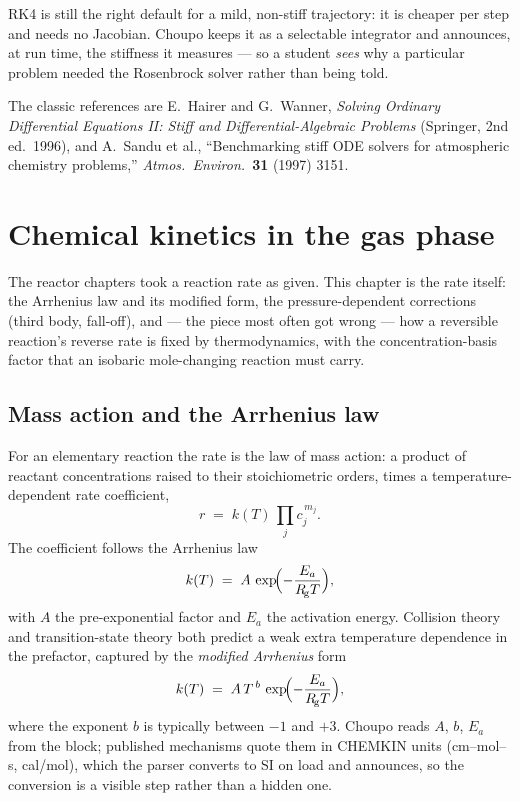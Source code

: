 \documentclass[11pt,a4paper]{article}
\newcommand{\Rgas}{R_{\!\mathrm{g}}}                %
\begin{document}
\begin{intuition}
RK4 is still the right default for a mild, non-stiff trajectory: it is
cheaper per step and needs no Jacobian.  Choupo keeps it as a
selectable integrator and announces, at run time, the stiffness it
measures --- so a student \emph{sees} why a particular problem needed
the Rosenbrock solver rather than being told.
\end{intuition}

The classic references are E.~Hairer and G.~Wanner, \emph{Solving
Ordinary Differential Equations II: Stiff and Differential-Algebraic
Problems} (Springer, 2nd ed.\ 1996), and A.~Sandu et al., ``Benchmarking
stiff ODE solvers for atmospheric chemistry problems,'' \emph{Atmos.\
Environ.}\ \textbf{31} (1997) 3151.

\section{Chemical kinetics in the gas phase}\label{ch:gas-kinetics}

\begin{whatyoulllearn}
The reactor chapters took a reaction rate as given.  This chapter is
the rate itself: the Arrhenius law and its modified form, the
pressure-dependent corrections (third body, fall-off), and --- the
piece most often got wrong --- how a reversible reaction's reverse
rate is fixed by thermodynamics, with the concentration-basis factor
that an isobaric mole-changing reaction must carry.
\end{whatyoulllearn}

\subsection{Mass action and the Arrhenius law}

For an elementary reaction the rate is the law of mass action: a
product of reactant concentrations raised to their stoichiometric
orders, times a temperature-dependent rate coefficient,
\begin{equation}
    r \;=\; k(T)\,\prod_j c_j^{\,m_j}.
    \label{eq:mass-action}
\end{equation}
The coefficient follows the Arrhenius law
\begin{equation}
    k(T) \;=\; A\,\exp\!\Bigl(-\frac{E_a}{\Rgas T}\Bigr),
    \label{eq:arrhenius}
\end{equation}
with $A$ the pre-exponential factor and $E_a$ the activation energy.
Collision theory and transition-state theory both predict a weak extra
temperature dependence in the prefactor, captured by the
\emph{modified Arrhenius} form
\begin{equation}
    k(T) \;=\; A\,T^{\,b}\,\exp\!\Bigl(-\frac{E_a}{\Rgas T}\Bigr),
    \label{eq:mod-arrhenius}
\end{equation}
where the exponent $b$ is typically between $-1$ and $+3$.  Choupo
reads $A$, $b$, $E_a$ from the \code{kinetics} block; published
mechanisms quote them in CHEMKIN units (cm--mol--s, cal/mol), which
the parser converts to SI on load and announces, so the conversion is
a visible step rather than a hidden one.
\end{document}
